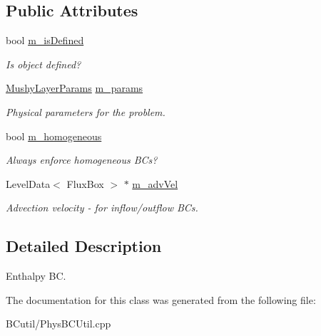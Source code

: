 \subsection*{Public Attributes}
\begin{DoxyCompactItemize}
\item 
\hypertarget{class_basic_enthalpy_b_c_function_ab64add66ca792b3917c2bab31b798628}{bool \hyperlink{class_basic_enthalpy_b_c_function_ab64add66ca792b3917c2bab31b798628}{m\-\_\-is\-Defined}}\label{class_basic_enthalpy_b_c_function_ab64add66ca792b3917c2bab31b798628}

\begin{DoxyCompactList}\small\item\em Is object defined? \end{DoxyCompactList}\item 
\hypertarget{class_basic_enthalpy_b_c_function_a082cecb5acdca16f03ae95550285fa6a}{\hyperlink{class_mushy_layer_params}{Mushy\-Layer\-Params} \hyperlink{class_basic_enthalpy_b_c_function_a082cecb5acdca16f03ae95550285fa6a}{m\-\_\-params}}\label{class_basic_enthalpy_b_c_function_a082cecb5acdca16f03ae95550285fa6a}

\begin{DoxyCompactList}\small\item\em Physical parameters for the problem. \end{DoxyCompactList}\item 
\hypertarget{class_basic_enthalpy_b_c_function_aa8dc90e8ad44d4c56378a44496c90ec1}{bool \hyperlink{class_basic_enthalpy_b_c_function_aa8dc90e8ad44d4c56378a44496c90ec1}{m\-\_\-homogeneous}}\label{class_basic_enthalpy_b_c_function_aa8dc90e8ad44d4c56378a44496c90ec1}

\begin{DoxyCompactList}\small\item\em Always enforce homogeneous B\-Cs? \end{DoxyCompactList}\item 
\hypertarget{class_basic_enthalpy_b_c_function_a9d36255228aa9204d7050e764718073a}{Level\-Data$<$ Flux\-Box $>$ $\ast$ \hyperlink{class_basic_enthalpy_b_c_function_a9d36255228aa9204d7050e764718073a}{m\-\_\-adv\-Vel}}\label{class_basic_enthalpy_b_c_function_a9d36255228aa9204d7050e764718073a}

\begin{DoxyCompactList}\small\item\em Advection velocity -\/ for inflow/outflow B\-Cs. \end{DoxyCompactList}\end{DoxyCompactItemize}


\subsection{Detailed Description}
Enthalpy B\-C. 

The documentation for this class was generated from the following file\-:\begin{DoxyCompactItemize}
\item 
B\-Cutil/Phys\-B\-C\-Util.\-cpp\end{DoxyCompactItemize}
